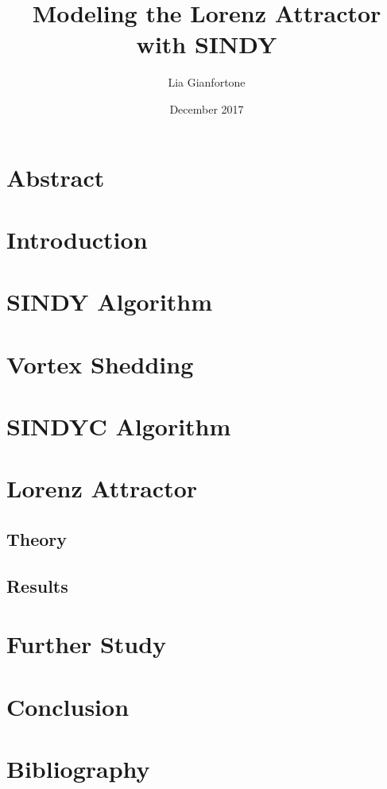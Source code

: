 \documentclass[12pt,preprintnumbers,amsmath,amssymb,titlepage]{report}
\begin{document}
\title{Modeling the Lorenz Attractor with SINDY}
\author{Lia Gianfortone}
\date{December 2017}

\maketitle


\section*{Abstract}

\section*{Introduction}



\section*{SINDY Algorithm}

\section*{Vortex Shedding}

\section*{SINDYC Algorithm}



\section*{Lorenz Attractor}

\subsection*{Theory}

\subsection*{Results}



\section{Further Study}

\section*{Conclusion}

\section*{Bibliography}


\end{document}
